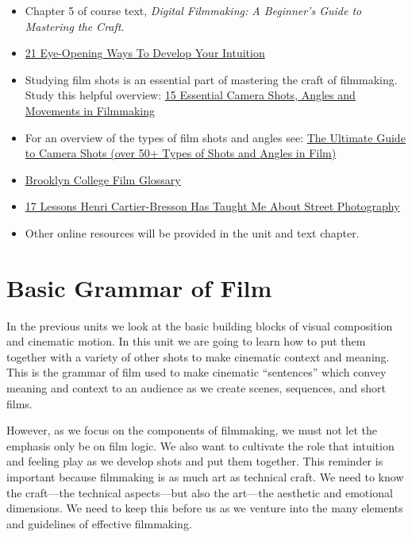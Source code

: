 \documentclass[
]{book}
\providecommand{\tightlist}{%
  \setlength{\itemsep}{0pt}\setlength{\parskip}{0pt}}
\begin{document}
\begin{itemize}
\tightlist
\item
  Chapter 5 of course text, \emph{Digital Filmmaking: A Beginner's Guide to Mastering the Craft}.\\
\item
  \href{https://liveboldandbloom.com/04/self-improvement/develop-your-intuition}{21 Eye-Opening Ways To Develop Your Intuition}\\
\item
  Studying film shots is an essential part of mastering the craft of filmmaking. Study this helpful overview: \href{https://www.youtube.com/watch?v=7y0ouVBcogU}{15 Essential Camera Shots, Angles and Movements in Filmmaking}\\
\item
  For an overview of the types of film shots and angles see: \href{https://www.studiobinder.com/blog/ultimate-guide-to-camera-shots/}{The Ultimate Guide to Camera Shots (over 50+ Types of Shots and Angles in Film)}\\
\item
  \href{http://userhome.brooklyn.cuny.edu/anthro/jbeatty/COURSES/glossary.htm}{Brooklyn College Film Glossary}\\
\item
  \href{https://erickimphotography.com/blog/2014/12/09/17-lessons-henri-cartier-bresson-taught-street-photography/}{17 Lessons Henri Cartier-Bresson Has Taught Me About Street Photography}\\
\item
  Other online resources will be provided in the unit and text chapter.
\end{itemize}

\hypertarget{basic-grammar-of-film}{%
\section{Basic Grammar of Film}\label{basic-grammar-of-film}}

In the previous units we look at the basic building blocks of visual composition and cinematic motion. In this unit we are going to learn how to put them together with a variety of other shots to make cinematic context and meaning. This is the grammar of film used to make cinematic ``sentences'' which convey meaning and context to an audience as we create scenes, sequences, and short films.

However, as we focus on the components of filmmaking, we must not let the emphasis only be on film logic. We also want to cultivate the role that intuition and feeling play as we develop shots and put them together. This reminder is important because filmmaking is as much art as technical craft. We need to know the craft---the technical aspects---but also the art---the aesthetic and emotional dimensions. We need to keep this before us as we venture into the many elements and guidelines of effective filmmaking.
\end{document}
